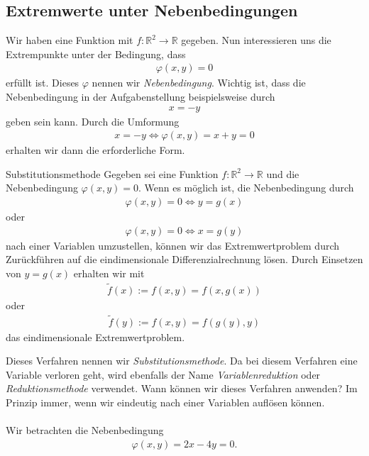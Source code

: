 \newpage
\subsection{Extremwerte unter Nebenbedingungen}
Wir haben eine Funktion mit $f : \mathbb{R}^2 \to \mathbb{R}$ gegeben.
Nun interessieren uns die Extrempunkte unter der Bedingung, dass 
\begin{align*}
\varphi(x,y) = 0
\end{align*}
erfüllt ist.
Dieses $\varphi$ nennen wir \textit{Nebenbedingung}.
Wichtig ist, dass die Nebenbedingung in der Aufgabenstellung beispielsweise durch
\begin{align*}
x = -y
\end{align*}
geben sein kann.
Durch die Umformung
\begin{align*}
x = -y 
\Leftrightarrow
\varphi(x,y) = x + y = 0
\end{align*}
erhalten wir dann die erforderliche Form.\\
\begin{mybox}{Substitutionsmethode}
Gegeben sei eine Funktion $f : \mathbb{R}^2 \to \mathbb{R}$ und
die Nebenbedingung $\varphi(x,y) = 0$.
Wenn es möglich ist, die Nebenbedingung durch
\begin{align*}
\varphi(x,y) = 0 \Leftrightarrow
y = g(x) 
\end{align*}
oder 
\begin{align*}
\varphi(x,y) = 0 \Leftrightarrow
x = g(y) 
\end{align*}
nach einer Variablen umzustellen, können wir das Extremwertproblem durch
Zurückführen auf die eindimensionale Differenzialrechnung lösen.
Durch Einsetzen von $y=g(x)$ erhalten wir mit
\begin{align*}
\tilde{f}(x) := f(x,y) = f(x,g(x))
\end{align*}
oder
\begin{align*}
\tilde{f}(y) := f(x,y) = f(g(y),y)
\end{align*}
das eindimensionale Extremwertproblem.
\end{mybox}
Dieses Verfahren nennen wir \textit{Substitutionsmethode}.
Da bei diesem Verfahren eine Variable verloren geht, wird ebenfalls der Name 
\textit{Variablenreduktion} oder \textit{Reduktionsmethode} verwendet.
Wann können wir dieses Verfahren anwenden?
Im Prinzip immer, wenn wir eindeutig nach einer Variablen auflösen können.\\ \\
Wir betrachten die Nebenbedingung
\begin{align*}
\varphi(x,y) = 2x -4y = 0.
\end{align*}
